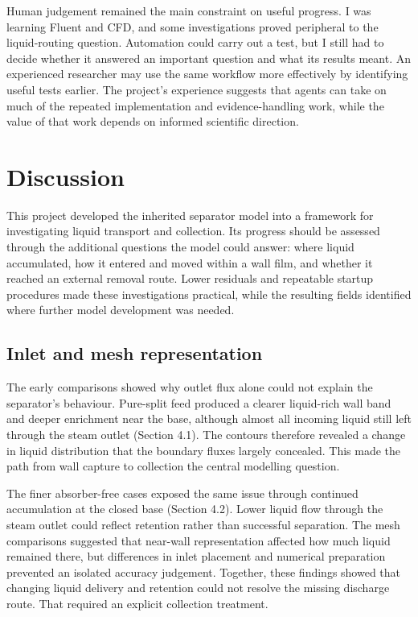 \documentclass[12pt]{article}
\begin{document}
Human judgement remained the main constraint on useful progress. I was learning Fluent and CFD, and some investigations proved peripheral to the liquid-routing question. Automation could carry out a test, but I still had to decide whether it answered an important question and what its results meant. An experienced researcher may use the same workflow more effectively by identifying useful tests earlier. The project's experience suggests that agents can take on much of the repeated implementation and evidence-handling work, while the value of that work depends on informed scientific direction.

\section{Discussion}\label{discussion}

This project developed the inherited separator model into a framework for investigating liquid transport and collection. Its progress should be assessed through the additional questions the model could answer: where liquid accumulated, how it entered and moved within a wall film, and whether it reached an external removal route. Lower residuals and repeatable startup procedures made these investigations practical, while the resulting fields identified where further model development was needed.

\subsection{Inlet and mesh representation}\label{inlet-and-mesh-representation}

The early comparisons showed why outlet flux alone could not explain the separator's behaviour. Pure-split feed produced a clearer liquid-rich wall band and deeper enrichment near the base, although almost all incoming liquid still left through the steam outlet (Section 4.1). The contours therefore revealed a change in liquid distribution that the boundary fluxes largely concealed. This made the path from wall capture to collection the central modelling question.

The finer absorber-free cases exposed the same issue through continued accumulation at the closed base (Section 4.2). Lower liquid flow through the steam outlet could reflect retention rather than successful separation. The mesh comparisons suggested that near-wall representation affected how much liquid remained there, but differences in inlet placement and numerical preparation prevented an isolated accuracy judgement. Together, these findings showed that changing liquid delivery and retention could not resolve the missing discharge route. That required an explicit collection treatment.
\end{document}
